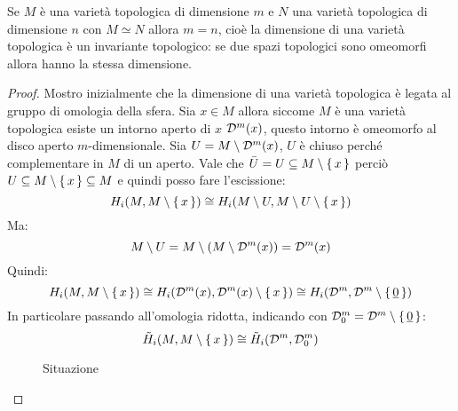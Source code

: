 \begin{theorem}
  Se $ M $ è una varietà topologica di dimensione $ m $ e $ N $ una varietà
  topologica di dimensione $ n $ con $ M \simeq N $ allora $ m = n $, cioè la dimensione
  di una varietà topologica è un invariante topologico: se due spazi topologici sono
  omeomorfi allora hanno la stessa dimensione.
\end{theorem}
\begin{proof}
  Mostro inizialmente che la dimensione di una varietà topologica è legata al
  gruppo di omologia della sfera. Sia $ x \in M $ allora siccome $ M $ è una
  varietà topologica esiste un intorno aperto di $ x $ $ \mathcal{D}^{m}(x) $, questo
  intorno è omeomorfo al disco aperto $ m $-dimensionale. Sia
  $ U = M \setminus \mathcal{D}^{m}(x) $, $ U $ è chiuso perché complementare in $ M $ di un
  aperto. Vale che $ \bar{U} = U \subseteq M \setminus \set{x} $ perciò
  $ U \subseteq M \setminus \set{x} \subseteq M $ e quindi posso fare l'escissione:
  \[
    H_i(M, M \setminus \set{x}) \cong H_i(M \setminus U, M \setminus U \setminus \set{x})
  \]
  Ma:
  \[
    M \setminus U  = M \setminus (M \setminus \mathcal{D}^{m}(x)) = \mathcal{D}^{m}(x)
  \]
  Quindi:
  \[
    H_i(M, M \setminus \set{x}) \cong H_i(\mathcal{D}^{m}(x), \mathcal{D}^{m}(x) \setminus \set{x}) \cong H_i(\mathcal{D}^{m}, \mathcal{D}^{m} \setminus \set{\underline{0}})
  \]
  In particolare passando all'omologia ridotta, indicando con $ \mathcal{D}^{m}_0 =  \mathcal{D}^{m} \setminus \set{\underline{0}}$:
  \[
    \tilde{H}_i(M, M \setminus \set{x}) \cong  \tilde{H}_i(\mathcal{D}^{m}, \mathcal{D}^{m}_0)
  \]
  \begin{figure}[htbp]
    \centering
    \caption{Situazione}
    \label{fig:lez13:dimension_topological_invariance}
  \end{figure}


\end{proof}
